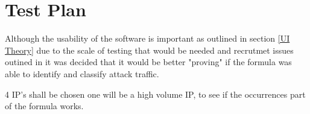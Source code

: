 \section{Test Plan}

Although the usability of the software is important as outlined in section \ref{UI Theory} due to the scale of testing that would be needed and recrutmet issues outined in \cite{ben2015effects} it was decided that it would be better "proving" if the formula was able to identify and classify attack traffic. 

4 IP's shall be chosen one will be a high volume IP, to see if the occurrences part of the formula works.